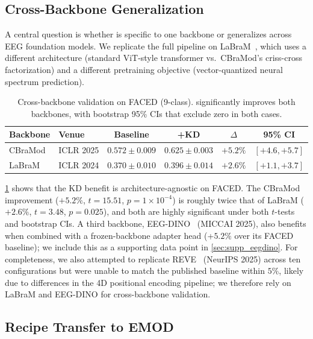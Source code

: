 \subsection{Cross-Backbone Generalization}
\label{sec:cross_backbone}
\vspace{-1mm}

A central question is whether \ours is specific to one backbone or generalizes across EEG foundation models. We replicate the full pipeline on LaBraM~\cite{jiang2024labram}, which uses a different architecture (standard ViT-style transformer vs.\ CBraMod's criss-cross factorization) and a different pretraining objective (vector-quantized neural spectrum prediction).

\begin{table}[!t]
\caption{Cross-backbone validation on FACED (9-class). \ours significantly improves both backbones, with bootstrap 95\% CIs that exclude zero in both cases.}
\small
\centering
\begin{tabular}{llcccc}
\toprule
Backbone & Venue & Baseline & +KD & $\Delta$ & 95\% CI \\
\midrule
CBraMod & ICLR 2025 & $0.572 \pm 0.009$ & $0.625 \pm 0.003$ & $\mathbf{+5.2\%}$ & $[+4.6, +5.7]$ \\
LaBraM & ICLR 2024 & $0.370 \pm 0.010$ & $0.396 \pm 0.014$ & $\mathbf{+2.6\%}$ & $[+1.1, +3.7]$ \\
\bottomrule
\end{tabular}
\label{tab:cross_backbone}
\end{table}

\cref{tab:cross_backbone} shows that the KD benefit is architecture-agnostic on FACED. The CBraMod improvement ($+5.2\%$, $t = 15.51$, $p = 1 \times 10^{-4}$) is roughly twice that of LaBraM ($+2.6\%$, $t = 3.48$, $p = 0.025$), and both are highly significant under both $t$-tests and bootstrap CIs. A third backbone, EEG-DINO~\cite{wang2025eegdino} (MICCAI 2025), also benefits when combined with a frozen-backbone adapter head (+$5.2\%$ over its FACED baseline); we include this as a supporting data point in \cref{sec:supp_eegdino}. For completeness, we also attempted to replicate REVE~\cite{elouahidi2025reve} (NeurIPS 2025) across ten configurations but were unable to match the published baseline within $5\%$, likely due to differences in the 4D positional encoding pipeline; we therefore rely on LaBraM and EEG-DINO for cross-backbone validation.

\subsection{Recipe Transfer to EMOD}
\label{sec:emod_recipe}
\vspace{-1mm}

